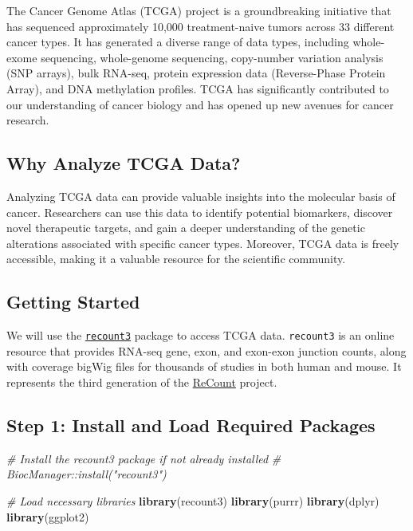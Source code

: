\documentclass[
]{book}
\newenvironment{Shaded}{\begin{snugshade}}{\end{snugshade}}
\newcommand{\CommentTok}[1]{\textcolor[rgb]{0.56,0.35,0.01}{\textit{#1}}}
\newcommand{\FunctionTok}[1]{\textcolor[rgb]{0.13,0.29,0.53}{\textbf{#1}}}
\newcommand{\NormalTok}[1]{#1}
\begin{document}
The Cancer Genome Atlas (TCGA) project is a groundbreaking initiative that has sequenced approximately 10,000 treatment-naive tumors across 33 different cancer types. It has generated a diverse range of data types, including whole-exome sequencing, whole-genome sequencing, copy-number variation analysis (SNP arrays), bulk RNA-seq, protein expression data (Reverse-Phase Protein Array), and DNA methylation profiles. TCGA has significantly contributed to our understanding of cancer biology and has opened up new avenues for cancer research.

\hypertarget{why-analyze-tcga-data}{%
\subsection{Why Analyze TCGA Data?}\label{why-analyze-tcga-data}}

Analyzing TCGA data can provide valuable insights into the molecular basis of cancer. Researchers can use this data to identify potential biomarkers, discover novel therapeutic targets, and gain a deeper understanding of the genetic alterations associated with specific cancer types. Moreover, TCGA data is freely accessible, making it a valuable resource for the scientific community.

\hypertarget{getting-started-1}{%
\subsection{Getting Started}\label{getting-started-1}}

We will use the \href{https://bioconductor.org/packages/release/bioc/html/recount3.html}{\texttt{recount3}} package to access TCGA data. \texttt{recount3} is an online resource that provides RNA-seq gene, exon, and exon-exon junction counts, along with coverage bigWig files for thousands of studies in both human and mouse. It represents the third generation of the \href{https://rna.recount.bio/}{ReCount} project.

\hypertarget{step-1-install-and-load-required-packages}{%
\subsection{Step 1: Install and Load Required Packages}\label{step-1-install-and-load-required-packages}}

\begin{Shaded}
\begin{Highlighting}[]
\CommentTok{\# Install the recount3 package if not already installed}
\CommentTok{\# BiocManager::install("recount3")}

\CommentTok{\# Load necessary libraries}
\FunctionTok{library}\NormalTok{(recount3)}
\FunctionTok{library}\NormalTok{(purrr)}
\FunctionTok{library}\NormalTok{(dplyr)}
\FunctionTok{library}\NormalTok{(ggplot2)}
\end{Highlighting}
\end{Shaded}
\end{document}
